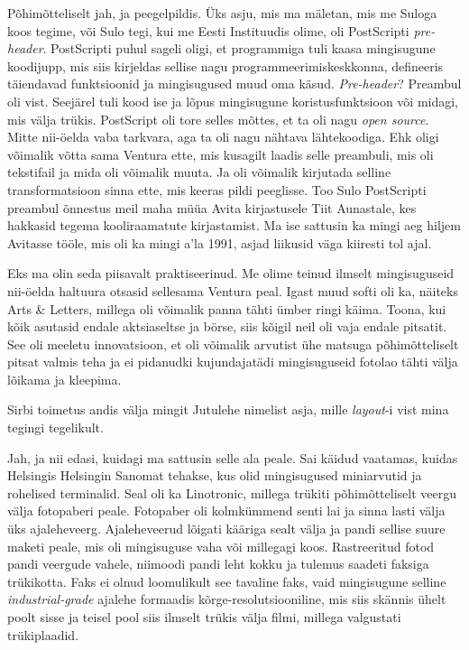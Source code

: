 Põhimõtteliselt jah, ja peegelpildis. Üks asju, mis ma mäletan, mis me 
Suloga koos tegime, või Sulo tegi, kui me Eesti 
Instituudis olime, oli PostScripti \emph{pre-header}. 
PostScripti puhul sageli oligi, et programmiga tuli kaasa mingisugune 
koodijupp, mis siis kirjeldas sellise nagu programmeerimiskeskkonna, defineeris 
täiendavad funktsioonid ja mingisugused muud oma käsud. \emph{Pre-header}? 
Preambul oli vist. Seejärel tuli  kood ise ja lõpus mingisugune 
koristusfunktsioon või midagi, mis välja trükis. PostScript oli tore selles 
mõttes, et ta oli nagu \emph{open source}. Mitte nii-öelda vaba tarkvara, aga 
ta oli nagu nähtava lähtekoodiga. Ehk oligi võimalik võtta sama Ventura ette, 
mis kusagilt laadis selle preambuli, mis oli tekstifail ja mida oli võimalik 
muuta. Ja oli võimalik kirjutada selline transformatsioon sinna ette, mis 
keeras pildi peeglisse. Too Sulo PostScripti preambul õnnestus meil maha müüa 
Avita kirjastusele Tiit Aunastale, kes hakkasid tegema kooliraamatute kirjastamist. Ma ise sattusin ka  
mingi aeg hiljem  Avitasse tööle, mis oli ka mingi a'la 1991, asjad liikusid 
väga kiiresti tol ajal.


Eks ma olin seda piisavalt praktiseerinud. Me olime teinud ilmselt 
mingisuguseid nii-öelda haltuura otsasid sellesama Ventura peal. Igast muud 
softi oli ka, näiteks Arts \& Letters, millega oli võimalik panna tähti ümber 
ringi käima. Toona, kui kõik asutasid endale aktsiaseltse ja börse, siis kõigil 
neil oli vaja endale pitsatit. See oli meeletu innovatsioon, et oli võimalik 
arvutist ühe matsuga põhimõtteliselt pitsat valmis teha ja ei pidanudki 
kujundajatädi mingisuguseid fotolao tähti välja lõikama ja kleepima. 

Sirbi  toimetus andis välja mingit Jutulehe nimelist asja, mille  \emph{layout}-i vist mina tegingi 
tegelikult. 

Jah, ja nii edasi, kuidagi ma sattusin selle ala peale. Sai käidud vaatamas, 
kuidas Helsingis Helsingin Sanomat  tehakse, kus olid 
mingisugused miniarvutid ja   rohelised terminalid. Seal oli ka 
Linotronic, millega trükiti põhimõtteliselt veergu välja 
fotopaberi peale. Fotopaber oli kolmkümmend senti lai ja sinna lasti välja  üks 
ajaleheveerg. Ajaleheveerud lõigati kääriga sealt välja ja pandi sellise suure 
maketi peale, mis oli mingisuguse vaha või millegagi koos. Rastreeritud fotod 
pandi veergude vahele, niimoodi pandi leht kokku ja tulemus saadeti faksiga 
trükikotta. Faks ei olnud loomulikult see tavaline faks, vaid mingisugune 
selline \emph{industrial-grade} ajalehe formaadis kõrge-resolutsiooniline,  mis 
siis  skännis ühelt poolt sisse ja teisel pool siis  ilmselt trükis välja 
filmi, millega valgustati trükiplaadid. 

